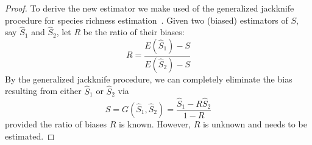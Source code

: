 \begin{proof}
To derive the new estimator we make used of the generalized jackknife procedure for species richness estimation~\cite{heltshe1983estimating}. Given two (biased) estimators of $S$, say $\hat{S}_1$ and $\hat{S}_2$, let $R$ be the ratio of their biases:
\begin{equation}
R = \frac{E(\hat{S}_1) - S}{E(\hat{S}_2) - S}
\end{equation}
By the generalized jackknife procedure, we can completely eliminate the bias resulting from either $\hat{S}_1$ or $\hat{S}_2$ via
\begin{equation}
S = G(\hat{S}_1, \hat{S}_2) = \frac{\hat{S}_1 - R\hat{S}_2}{1 - R}
\label{eq:jknife}
\end{equation}
provided the ratio of biases $R$ is known. However, $R$ is unknown and needs to be estimated. 


\end{proof}
